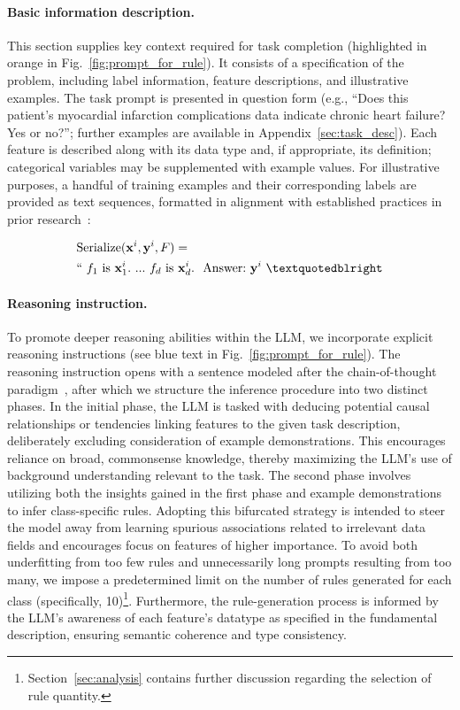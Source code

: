 \paragraph{Basic information description.} This section supplies key context required for task completion (highlighted in orange in Fig.~\ref{fig:prompt_for_rule}). It consists of a specification of the problem, including label information, feature descriptions, and illustrative examples. The task prompt is presented in question form (e.g., ``Does this patient's myocardial infarction complications data indicate chronic heart failure? Yes or no?''; further examples are available in Appendix~\ref{sec:task_desc}). Each feature is described along with its data type and, if appropriate, its definition; categorical variables may be supplemented with example values. For illustrative purposes, a handful of training examples and their corresponding labels are provided as text sequences, formatted in alignment with established practices in prior research~\cite{dinh2022lift,hegselmann2023tabllm}:

\begin{align}
&\text{Serialize}(\mathbf{x}^i,\mathbf{y}^i, F) = \nonumber \\ 
&``\ f_1\ \text{is}\ \mathbf{x}^i_1.\ ... \ f_d\  \text{is}\  \mathbf{x}^i_d.\ \ \text{Answer:}\  \mathbf{y}^i\ ”
\end{align}

\vspace*{-0.12in}
\paragraph{Reasoning instruction.} To promote deeper reasoning abilities within the LLM, we incorporate explicit reasoning instructions (see blue text in Fig.~\ref{fig:prompt_for_rule}). The reasoning instruction opens with a sentence modeled after the chain-of-thought paradigm~\cite{wei2022chain}, after which we structure the inference procedure into two distinct phases. In the initial phase, the LLM is tasked with deducing potential causal relationships or tendencies linking features to the given task description, deliberately excluding consideration of example demonstrations. This encourages reliance on broad, commonsense knowledge, thereby maximizing the LLM’s use of background understanding relevant to the task. The second phase involves utilizing both the insights gained in the first phase and example demonstrations to infer class-specific rules. Adopting this bifurcated strategy is intended to steer the model away from learning spurious associations related to irrelevant data fields and encourages focus on features of higher importance. To avoid both underfitting from too few rules and unnecessarily long prompts resulting from too many, we impose a predetermined limit on the number of rules generated for each class (specifically, 10)\footnote{Section~\ref{sec:analysis} contains further discussion regarding the selection of rule quantity.}. Furthermore, the rule-generation process is informed by the LLM’s awareness of each feature's datatype as specified in the fundamental description, ensuring semantic coherence and type consistency.

